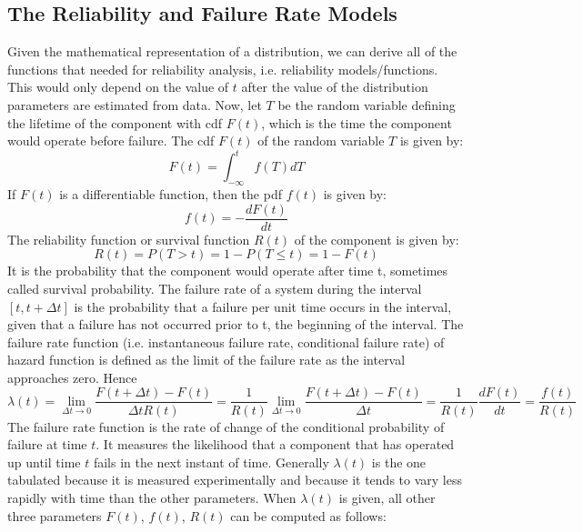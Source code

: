 \subsection{The Reliability and Failure Rate Models}
Given the mathematical representation of a distribution, we can derive all of the functions that needed
for reliability analysis, i.e. reliability models/functions. This would only depend on the value of $t$
after the value of the distribution parameters are estimated from data.
Now, let $T$ be the random variable defining the lifetime of the component with cdf $F(t)$, which is the
time the component would operate before failure. The cdf $F(t)$ of the random variable $T$ is given by:
\begin{equation}
  F(t) = \int_{-\infty}^{t} f(T)dT
\end{equation}
If $F(t)$ is a differentiable function, then the pdf $f(t)$ is given by:
\begin{equation}
  f(t) = - \frac{dF(t)}{dt}
\end{equation}
The reliability function or survival function $R(t)$ of the component is given by:
\begin{equation}
  R(t) = P(T>t) = 1 - P(T\leq t) = 1-F(t)
\end{equation}
It is the probability that the component would operate after time t, sometimes called survival probability.
The failure rate of a system during the interval $[t,t+\Delta t]$ is the probability that a failure per
unit time occurs in the interval, given that a failure has not occurred prior to t, the beginning of the
interval. The failure rate function (i.e. instantaneous failure rate, conditional failure rate) of hazard
function is defined as the limit of the failure rate as the interval approaches zero. Hence
\begin{equation}
  \lambda (t)= \lim_{\Delta t\rightarrow 0} \frac{F(t+\Delta t) - F(t)}{\Delta tR(t)}
	 = \frac{1}{R(t)} \lim_{\Delta t\rightarrow 0} \frac{F(t+\Delta t) - F(t)}{\Delta t}
	 = \frac{1}{R(t)}\frac{dF(t)}{dt} = \frac{f(t)}{R(t)}
\end{equation}
The failure rate function is the rate of change of the conditional probability of failure at time $t$.
It measures the likelihood that a component that has operated up until time $t$ fails in the next
instant of time.
Generally $\lambda (t)$ is the one tabulated because it is measured experimentally and because it tends to
vary less rapidly with time than the other parameters. When $\lambda (t)$ is given, all other three
parameters $F(t)$, $f(t)$, $R(t)$ can be computed as follows:
